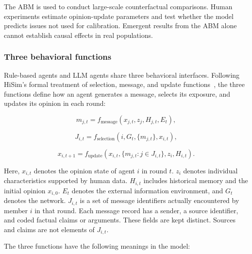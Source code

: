 \documentclass[11pt,a4paper]{article}
\begin{document}
The ABM is used to conduct large-scale counterfactual comparisons. Human experiments estimate opinion-update parameters and test whether the model predicts issues not used for calibration. Emergent results from the ABM alone cannot establish causal effects in real populations.

\subsubsection{Three behavioral functions}

Rule-based agents and LLM agents share three behavioral interfaces. Following HiSim's formal treatment of selection, message, and update functions~\citep{mou2024}, the three functions define how an agent generates a message, selects its exposure, and updates its opinion in each round:

\begin{equation*}
m_{j,t}=f_{\text{message}}(x_{j,t},z_j,H_{j,t},E_t),
\end{equation*}

\begin{equation*}
J_{i,t}=f_{\text{selection}}(i,G_t,\{m_{j,t}\},x_{i,t}),
\end{equation*}

\begin{equation*}
x_{i,t+1}=f_{\text{update}}
\left(x_{i,t},\{m_{j,t}:j\in J_{i,t}\},z_i,H_{i,t}\right).
\end{equation*}

Here, $x_{i,t}$ denotes the opinion state of agent $i$ in round $t$. $z_i$ denotes individual characteristics supported by human data. $H_{i,t}$ includes historical memory and the initial opinion $x_{i,0}$. $E_t$ denotes the external information environment, and $G_t$ denotes the network. $J_{i,t}$ is a set of message identifiers actually encountered by member $i$ in that round. Each message record has a sender, a source identifier, and coded factual claims or arguments. These fields are kept distinct. Sources and claims are not elements of $J_{i,t}$.

The three functions have the following meanings in the model:
\end{document}
